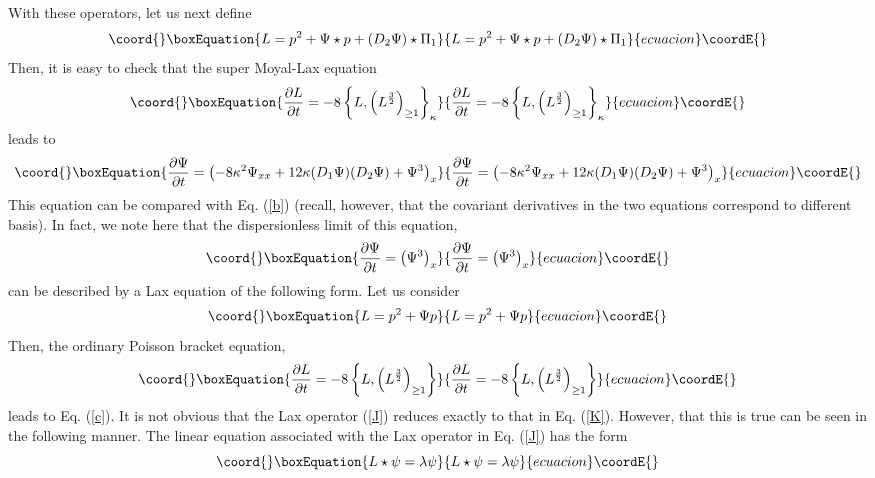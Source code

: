 \documentclass[a4paper,11pt]{article}
\begin{document}
With these operators, let us next define
\begin{equation}\coord{}\boxEquation{
L = p^{2} + \Psi\star p + (D_{2}\Psi)\star \Pi_{1}\label{J}
}{
L = p^{2} + \Psi\star p + (D_{2}\Psi)\star \Pi_{1}}{ecuacion}\coordE{}\end{equation}
Then, it is easy to check that the super Moyal-Lax equation
\begin{equation}\coord{}\boxEquation{
{\partial L\over \partial t} = -8 \left\{L, \left(L^{3\over
2}\right)_{\geq 1}\right\}_{\kappa}
}{
{\partial L\over \partial t} = -8 \left\{L, \left(L^{3\over
2}\right)_{\geq 1}\right\}_{\kappa}
}{ecuacion}\coordE{}\end{equation}
leads to
\begin{equation}\coord{}\boxEquation{
{\partial \Psi\over \partial t} = \left(-8\kappa^{2} \Psi_{xx} +
12\kappa (D_{1}\Psi)(D_{2}\Psi) + \Psi^{3}\right)_{x}
}{
{\partial \Psi\over \partial t} = \left(-8\kappa^{2} \Psi_{xx} +
12\kappa (D_{1}\Psi)(D_{2}\Psi) + \Psi^{3}\right)_{x}
}{ecuacion}\coordE{}\end{equation}
This equation can be compared with Eq. (\ref{b}) (recall, however,
that the covariant derivatives in the two equations correspond to
different basis). In fact, we note
here that the dispersionless limit of this equation, 
\begin{equation}\coord{}\boxEquation{
{\partial \Psi\over \partial t} = \left(\Psi^{3}\right)_{x}\label{c}
}{
{\partial \Psi\over \partial t} = \left(\Psi^{3}\right)_{x}}{ecuacion}\coordE{}\end{equation}
can be described by a Lax equation of the following form. Let us
consider
\begin{equation}\coord{}\boxEquation{
L = p^{2} + \Psi p\label{K}
}{
L = p^{2} + \Psi p}{ecuacion}\coordE{}\end{equation}
Then, the ordinary Poisson bracket equation,
\begin{equation}\coord{}\boxEquation{
{\partial L\over \partial t} = -8 \left\{L, \left(L^{3\over
2}\right)_{\geq 1}\right\}
}{
{\partial L\over \partial t} = -8 \left\{L, \left(L^{3\over
2}\right)_{\geq 1}\right\}
}{ecuacion}\coordE{}\end{equation}
leads to Eq. (\ref{c}). It is not obvious that the Lax operator
(\ref{J}) reduces exactly to that in Eq. (\ref{K}). However, that this
is true can be seen in the following manner. The linear equation
associated with the Lax operator in Eq. (\ref{J}) has the form
\begin{equation}\coord{}\boxEquation{
L\star \psi = \lambda \psi\label{L}
}{
L\star \psi = \lambda \psi}{ecuacion}\coordE{}\end{equation}
\end{document}
